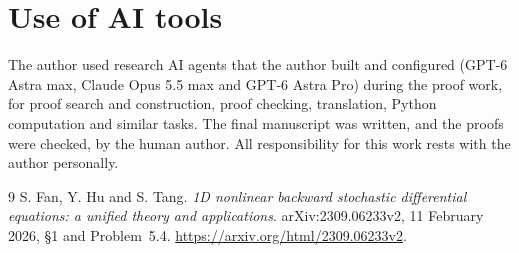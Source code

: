 \documentclass[11pt]{article}
\begin{document}
\section*{Use of AI tools}
The author used research AI agents that the author built and configured (GPT-6 Astra max,
Claude Opus 5.5 max and GPT-6 Astra Pro) during the proof work, for proof search and
construction, proof checking, translation, Python computation and similar tasks. The final
manuscript was written, and the proofs were checked, by the human author. All responsibility
for this work rests with the author personally.

\begin{thebibliography}{9}
 S. Fan, Y. Hu and S. Tang.
\emph{1D nonlinear backward stochastic differential equations: a unified theory and applications}.
arXiv:2309.06233v2, 11 February 2026, \S1 and Problem~5.4.
\url{https://arxiv.org/html/2309.06233v2}.
\end{thebibliography}
\end{document}
